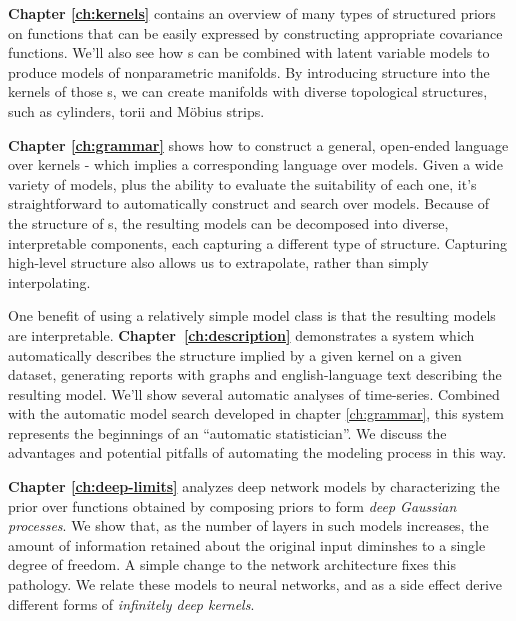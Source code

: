 {\bf Chapter \ref{ch:kernels}} contains an overview of many types of structured priors on functions that can be easily expressed by constructing appropriate covariance functions.
We'll also see how \gp{}s can be combined with latent variable models to produce models of nonparametric manifolds.
By introducing structure into the kernels of those \gp{}s, we can create manifolds with diverse topological structures, such as cylinders, torii and M\"obius strips.

{\bf Chapter \ref{ch:grammar}} shows how to construct a general, open-ended language over kernels - which implies a corresponding language over models.
Given a wide variety of models, plus the ability to evaluate the suitability of each one, it's straightforward to automatically construct and search over models.
Because of the structure of \gp{}s, the resulting models can be decomposed into diverse, interpretable components, each capturing a different type of structure.
Capturing high-level structure also allows us to extrapolate, rather than simply interpolating.

One benefit of using a relatively simple model class is that the resulting models are interpretable.
{\bf Chapter~\ref{ch:description}} demonstrates a system which automatically describes the structure implied by a given kernel on a given dataset, generating reports with graphs and english-language text describing the resulting model.
We'll show several automatic analyses of time-series.
Combined with the automatic model search developed in chapter \ref{ch:grammar}, this system represents the beginnings of an ``automatic statistician''.
We discuss the advantages and potential pitfalls of automating the modeling process in this way.

{\bf Chapter \ref{ch:deep-limits}} analyzes deep network models by characterizing the prior over functions obtained by composing \gp{} priors to form \emph{deep Gaussian processes}.
We show that, as the number of layers in such models increases, the amount of information retained about the original input diminshes to a single degree of freedom.
A simple change to the network architecture fixes this pathology.
We relate these models to neural networks, and as a side effect derive different forms of \emph{infinitely deep kernels}.

